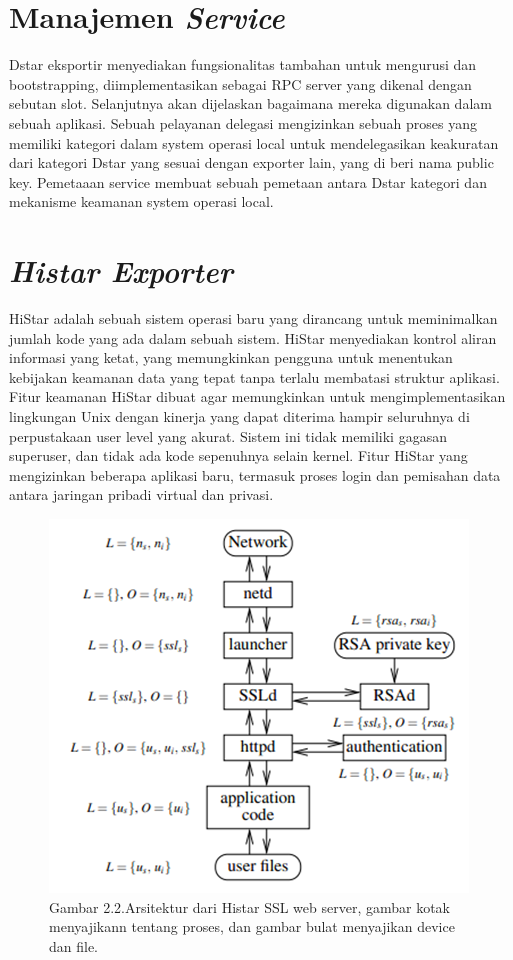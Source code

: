 \documentclass{jtetiproposalskripsi}
\begin{document}
\section{Manajemen \emph{Service}}
Dstar eksportir menyediakan fungsionalitas tambahan untuk mengurusi dan bootstrapping, diimplementasikan sebagai RPC server yang dikenal dengan sebutan slot. Selanjutnya akan dijelaskan bagaimana mereka digunakan dalam sebuah aplikasi. Sebuah pelayanan delegasi mengizinkan sebuah proses yang memiliki kategori dalam system operasi local untuk mendelegasikan keakuratan dari kategori Dstar yang sesuai dengan exporter lain, yang di beri nama public key. Pemetaaan service membuat sebuah pemetaan antara Dstar kategori dan mekanisme keamanan system operasi local.

\section{\emph{Histar Exporter}}  
HiStar adalah sebuah sistem operasi baru yang dirancang untuk meminimalkan jumlah kode yang ada dalam sebuah sistem. HiStar menyediakan kontrol aliran informasi yang ketat, yang memungkinkan pengguna untuk menentukan kebijakan keamanan data yang tepat tanpa terlalu membatasi struktur aplikasi. Fitur keamanan HiStar dibuat agar memungkinkan untuk mengimplementasikan lingkungan Unix dengan kinerja yang dapat diterima hampir seluruhnya di perpustakaan user level yang akurat. Sistem ini tidak memiliki gagasan superuser, dan tidak ada kode sepenuhnya selain kernel. Fitur HiStar yang mengizinkan beberapa aplikasi baru, termasuk proses login dan pemisahan data antara jaringan pribadi virtual dan privasi.


\begin{figure}[ht!]
  \centering
    \includegraphics{gambar/histar}
    \caption{Gambar 2.2.Arsitektur dari Histar SSL web server, gambar kotak menyajikann tentang proses, dan gambar bulat menyajikan device dan file.}
    \label{star}
\end{figure}
\end{document}
